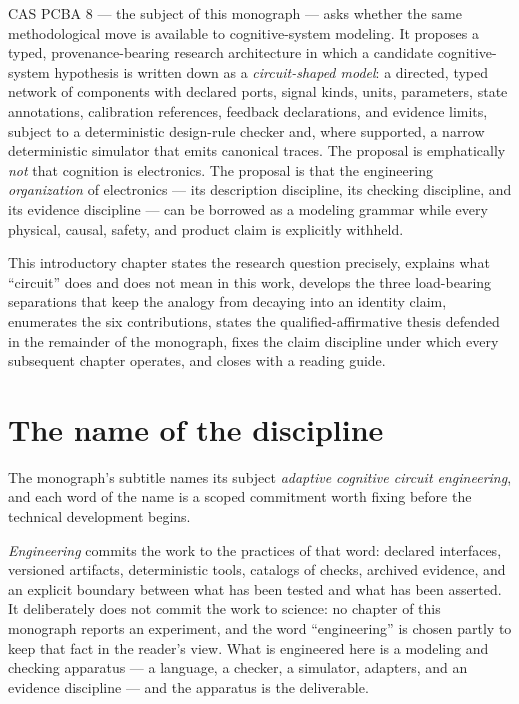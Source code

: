 CAS PCBA 8 --- the subject of this monograph --- asks whether the same
methodological move is available to cognitive-system modeling. It proposes a
typed, provenance-bearing research architecture in which a candidate
cognitive-system hypothesis is written down as a \emph{circuit-shaped model}:
a directed, typed network of components with declared ports, signal kinds,
units, parameters, state annotations, calibration references, feedback
declarations, and evidence limits, subject to a deterministic design-rule
checker and, where supported, a narrow deterministic simulator that emits
canonical traces. The proposal is emphatically \emph{not} that cognition is
electronics. The proposal is that the engineering \emph{organization} of
electronics --- its description discipline, its checking discipline, and its
evidence discipline --- can be borrowed as a modeling grammar while every
physical, causal, safety, and product claim is explicitly withheld.

This introductory chapter states the research question precisely, explains
what ``circuit'' does and does not mean in this work, develops the three
load-bearing separations that keep the analogy from decaying into an identity
claim, enumerates the six contributions, states the qualified-affirmative
thesis defended in the remainder of the monograph, fixes the claim discipline
under which every subsequent chapter operates, and closes with a reading
guide.

\section{The name of the discipline}\label{ch01:name}

The monograph's subtitle names its subject \emph{adaptive cognitive circuit
engineering}, and each word of the name is a scoped commitment worth fixing
before the technical development begins.

\emph{Engineering} commits the work to the practices of that word: declared
interfaces, versioned artifacts, deterministic tools, catalogs of checks,
archived evidence, and an explicit boundary between what has been tested and
what has been asserted. It deliberately does not commit the work to science:
no chapter of this monograph reports an experiment, and the word
``engineering'' is chosen partly to keep that fact in the reader's view.
What is engineered here is a modeling and checking apparatus --- a language,
a checker, a simulator, adapters, and an evidence discipline --- and the
apparatus is the deliverable.

